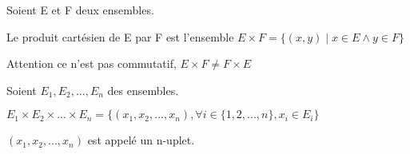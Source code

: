 \documentclass[a4paper, 12pt]{article}
\begin{document}
\begin{definition}
    Soient E et F deux ensembles.

    Le produit cartésien de E par F est l'ensemble $E \times F = \{(x, y) \mid x \in E \land y \in F\}$
\end{definition}

\begin{remark}
    Attention ce n'est pas commutatif, $E \times F \neq F \times E$
\end{remark}

\begin{definition}
    Soient $E_1, E_2, ..., E_n$ des ensembles.

    $E_1 \times E_2 \times ... \times E_n = \{(x_1, x_2, ..., x_n), \forall i \in \{1, 2, ..., n\}, x_i \in E_i\}$

    $(x_1, x_2, ..., x_n)$ est appelé un n-uplet.
\end{definition}
\end{document}
